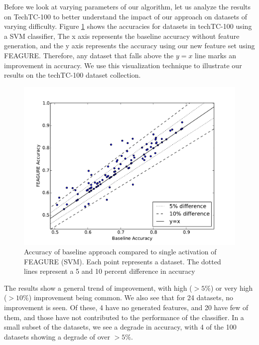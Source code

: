 \documentclass[twoside,11pt]{article}
\theoremstyle{definition}
\begin{document}
Before we look at varying parameters of our algorithm, let us analyze the results on TechTC-100 to better understand the impact of our approach on datasets of varying difficulty. Figure \ref{fig:svm_base_lvl1} shows the accuracies for datasets in techTC-100 using a SVM classifier, The x axis represents the baseline accuracy without feature generation, and the y axis represents the accuracy using our new feature set using FEAGURE. Therefore, any dataset that falls above the $y=x$ line marks an improvement in accuracy. We use this visualization technique to illustrate our results on the techTC-100 dataset collection.

\begin{figure}
	\centering
	\includegraphics[width=0.8\linewidth]{new_svm_10_base_vs_lvl1}
	\caption{Accuracy of
		baseline approach compared to single activation of FEAGURE (SVM). Each point represents a dataset. The dotted lines represent a 5 and 10 percent difference in accuracy}
	\label{fig:svm_base_lvl1}
\end{figure}

The results show a general trend of improvement, with high ($> 5\%$) or very high ($>10\%$) improvement being common. We also see that for 24 datasets, no improvement is seen. Of these, 4 have no generated features, and 20 have few of them, and those have not contributed to the performance of the classifier. In a small subset of the datasets, we see a degrade in accuracy, with 4 of the 100 datasets showing a degrade of over $> 5\%$. 
\end{document}
